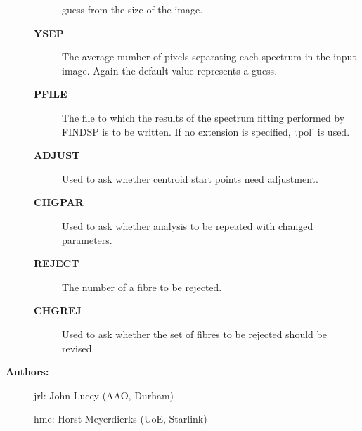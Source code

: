\begin{description}
\begin{description}
 guess from the size of the image.
\item [{\bf YSEP}]
 The average number of pixels separating each spectrum in the
 input image. Again the default value represents a guess.
\item [{\bf PFILE}]
 The file to which the results of the spectrum fitting performed
 by FINDSP is to be written.  If no extension is specified,
 `.pol' is used.
\item [{\bf ADJUST}]
 Used to ask whether centroid start points need adjustment.
\item [{\bf CHGPAR}]
 Used to ask whether analysis to be repeated with changed
 parameters.
\item [{\bf REJECT}]
 The number of a fibre to be rejected.
\item [{\bf CHGREJ}]
 Used to ask whether the set of fibres to be rejected should be
 revised.
\end{description}

\item [{\bf Authors:}]
 jrl: John Lucey (AAO, Durham)

 hme: Horst Meyerdierks (UoE, Starlink)
\end{description}
